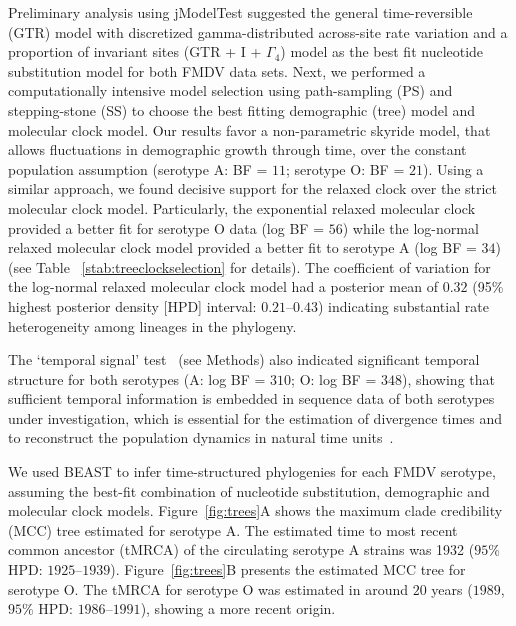 \documentclass[10pt]{article}
\begin{document}
Preliminary analysis using jModelTest suggested the general time-reversible (GTR) model with discretized gamma-distributed across-site rate variation and a proportion of invariant sites (GTR + I + $\Gamma_{4}$) model as the best fit nucleotide substitution model for both FMDV data sets.
Next, we performed a computationally intensive model selection using path-sampling (PS) and stepping-stone (SS) to choose the best fitting demographic (tree) model and molecular clock model.
Our results favor a non-parametric skyride model, that allows fluctuations in demographic growth through time, over the constant population assumption (serotype A: BF = $11$; serotype O: BF = $21$).
Using a similar approach, we  found decisive support for the relaxed clock over the strict molecular clock model.
Particularly, the exponential relaxed molecular clock provided a better fit for serotype O data (log BF = $56$) while the log-normal relaxed molecular clock model provided a better fit to serotype A (log BF = $34$) (see Table ~\ref{stab:treeclockselection} for details). 
The coefficient of variation for the log-normal relaxed molecular clock model had a posterior mean of $0.32$ (95\% highest posterior density [HPD] interval: $0.21$--$0.43$) indicating substantial rate heterogeneity among lineages in the phylogeny.

The `temporal signal' test~\cite{Faria2012} (see Methods) also indicated significant temporal structure for both serotypes (A: log BF = $310$; O: log BF = $348$), showing that sufficient temporal information is embedded in sequence data of both serotypes under investigation, which is essential for the estimation of divergence times and to reconstruct the population dynamics in natural time units~\cite{MEP}.

We used BEAST to infer time-structured phylogenies for each FMDV serotype, assuming the best-fit combination of nucleotide substitution, demographic and molecular clock models.
Figure~\ref{fig:trees}A shows the maximum clade credibility (MCC) tree estimated for serotype A.
The estimated time to most recent common ancestor (tMRCA) of the circulating serotype A strains was 1932 ($95\%$ HPD: $1925$--$1939$).
Figure~\ref{fig:trees}B presents the estimated MCC tree for serotype O.
The tMRCA for serotype O was estimated in around $20$ years ($1989$, $95\%$ HPD: $ 1986$--$1991$), showing a more recent origin. 
\end{document}
